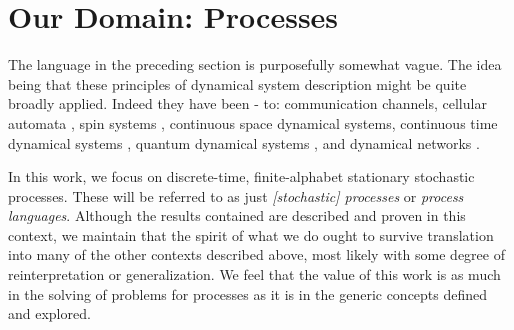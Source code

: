 \section{Our Domain: Processes}
The language in the preceding section is purposefully somewhat vague. The idea being that these principles of dynamical system description might be quite broadly applied. Indeed they have been - to: communication channels, cellular automata , spin systems , continuous space dynamical systems, continuous time dynamical systems , quantum dynamical systems , and dynamical networks . 

In this work, we focus on discrete-time, finite-alphabet stationary stochastic processes. These will be referred to as just \emph{[stochastic] processes} or \emph{process languages}. Although the results contained are described and proven in this context, we maintain that the spirit of what we do ought to survive translation into many of the other contexts described above, most likely with some degree of reinterpretation or generalization. We feel that the value of this work is as much in the solving of problems for processes as it is in the generic concepts defined and explored.


